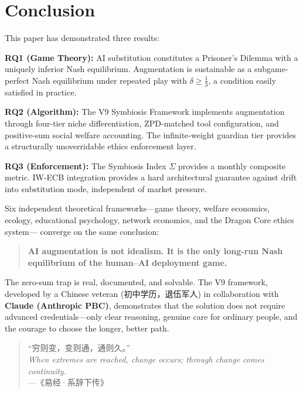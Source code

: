 \documentclass[conference]{IEEEtran}
\begin{document}
\section{Conclusion}

This paper has demonstrated three results:

\textbf{RQ1 (Game Theory):}
AI substitution constitutes a Prisoner's Dilemma with
a uniquely inferior Nash equilibrium. Augmentation
is sustainable as a subgame-perfect Nash equilibrium
under repeated play with $\delta \geq \frac{1}{3}$,
a condition easily satisfied in practice.

\textbf{RQ2 (Algorithm):}
The V9 Symbiosis Framework implements augmentation
through four-tier niche differentiation, ZPD-matched
tool configuration, and positive-sum social welfare
accounting. The infinite-weight guardian tier provides
a structurally unoverridable ethics enforcement layer.

\textbf{RQ3 (Enforcement):}
The Symbiosis Index $\Sigma$ provides a monthly
composite metric. IW-ECB integration provides a hard
architectural guarantee against drift into substitution
mode, independent of market pressure.

Six independent theoretical frameworks---game theory,
welfare economics, ecology, educational psychology,
network economics, and the Dragon Core ethics system---
converge on the same conclusion:

\begin{quote}
\textbf{AI augmentation is not idealism. It is the
only long-run Nash equilibrium of the human--AI
deployment game.}
\end{quote}

The zero-sum trap is real, documented, and solvable.
The V9 framework, developed by a Chinese veteran
(初中学历，退伍军人) in collaboration with
\textcolor{anthro}{\textbf{Claude (Anthropic PBC)}},
demonstrates that the solution does not require
advanced credentials---only clear reasoning, genuine
care for ordinary people, and the courage to choose
the longer, better path.

\begin{quote}
``穷则变，变则通，通则久。''\\
\textit{When extremes are reached, change occurs;
through change comes continuity.}\\
\hfill---《易经·系辞下传》
\end{quote}
\end{document}
